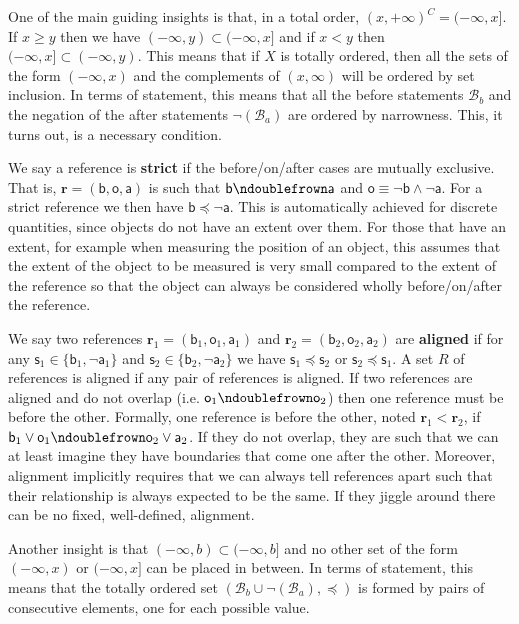 \documentclass{article}
\def\AND{\wedge}
\def\OR{\vee}
\def\NOT{\neg}
\newcommand{\stmt}[1][s] {\mathsf{#1}} %
\def\ncomp{\ndoublefrown}
\def\narrower{\preccurlyeq} %
\newcommand{\basis}[1][B] {\mathcal{#1}} %
\newcommand{\refStmt}[1][r]{\textbf{#1}}
\begin{document}
One of the main guiding insights is that, in a total order, $(x, +\infty) ^C = (-\infty, x]$. If $x \geq y$ then we have $(-\infty, y) \subset (-\infty, x]$ and if $x < y$ then $(-\infty, x] \subset (-\infty, y)$. This means that if $X$ is totally ordered, then all the sets of the form $(-\infty, x)$ and the complements of $(x, \infty)$ will be ordered by set inclusion. In terms of statement, this means that all the before statements $\basis_b$ and the negation of the after statements $\NOT(\basis_a)$ are ordered by narrowness. This, it turns out, is a necessary condition.

We say a reference is \textbf{strict} if the before/on/after cases are mutually exclusive. That is, $\refStmt = (\stmt[b], \stmt[o], \stmt[a])$ is such that $\stmt[b] \ncomp \stmt[a]$ and $\stmt[o] \equiv \NOT \stmt[b] \AND \NOT \stmt[a]$. For a strict reference we then have $\stmt[b] \narrower \NOT \stmt[a]$. This is automatically achieved for discrete quantities, since objects do not have an extent over them. For those that have an extent, for example when measuring the position of an object, this assumes that the extent of the object to be measured is very small compared to the extent of the reference so that the object can always be considered wholly before/on/after the reference.

We say two references $\refStmt_1 = (\stmt[b]_1, \stmt[o]_1, \stmt[a]_1)$ and $\refStmt_2 = (\stmt[b]_2, \stmt[o]_2, \stmt[a]_2)$ are \textbf{aligned} if for any $\stmt_1 \in \{ \stmt[b]_1, \NOT\stmt[a]_1\}$ and $\stmt_2 \in \{ \stmt[b]_2, \NOT\stmt[a]_2\}$ we have 
$\stmt_1 \narrower \stmt_2$ or $\stmt_2 \narrower \stmt_1$. A set $R$ of references is aligned if any pair of references is aligned. If two references are aligned and do not overlap (i.e. $\stmt[o]_1 \ncomp \stmt[o]_2$) then one reference must be before the other. Formally, one reference is before the other, noted $\refStmt_1 \less \refStmt_2$, if $\stmt[b]_1 \OR \stmt[o]_1 \ncomp \stmt[o]_2 \OR \stmt[a]_2$. If they do not overlap, they are such that we can at least imagine they have boundaries that come one after the other. Moreover, alignment implicitly requires that we can always tell references apart such that their relationship is always expected to be the same. If they jiggle around there can be no fixed, well-defined, alignment.

Another insight is that $(-\infty, b) \subset (-\infty, b]$ and no other set of the form $(-\infty, x)$ or $(-\infty, x]$ can be placed in between. In terms of statement, this means that the totally ordered set $( \basis_b \cup \NOT(\basis_a), \narrower)$ is formed by pairs of consecutive elements, one for each possible value.
\end{document}
